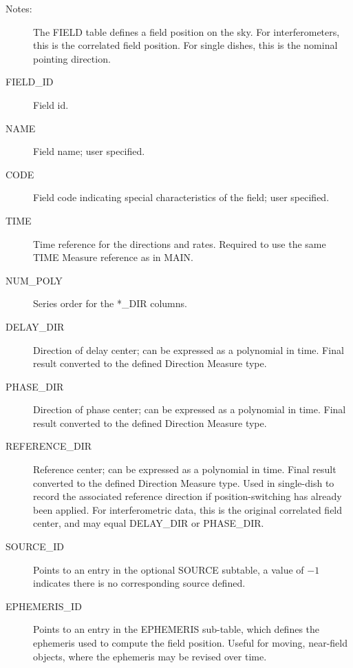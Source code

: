 \documentclass{article}
\begin{document}
\begin{description}

\item[Notes:] The FIELD table defines a field position on the sky. For
interferometers, this is the correlated field position. For single dishes,
this is the nominal pointing direction.

\item[FIELD\_ID] Field id.
\item[NAME] Field name; user specified.

\item[CODE] Field code indicating special characteristics of the
field; user specified.

\item[TIME] Time reference for the directions and rates. Required to 
use the same TIME Measure reference as in MAIN.

\item[NUM\_POLY] Series order for the *\_DIR columns.

\item[DELAY\_DIR] Direction of delay center; can be expressed as a
polynomial in time. Final result converted to the defined Direction
Measure type.

\item[PHASE\_DIR] Direction of phase center; can be expressed as a
polynomial in time. Final result converted to the defined Direction
Measure type.

\item[REFERENCE\_DIR] Reference center; can be expressed as a
polynomial in time. Final result converted to the defined Direction
Measure type. Used in single-dish to record the associated reference
direction if position-switching has already been applied. For
interferometric data, this is the original correlated field center,
and may equal DELAY\_DIR or PHASE\_DIR.

\item[SOURCE\_ID] Points to an entry in the optional SOURCE subtable, a
value of $-1$ indicates there is no corresponding source defined.

\item[EPHEMERIS\_ID] Points to an entry in the EPHEMERIS sub-table,
which defines the ephemeris used to compute the field position. Useful
for moving, near-field objects, where the ephemeris may be revised over time.

\end{description}
\end{document}
